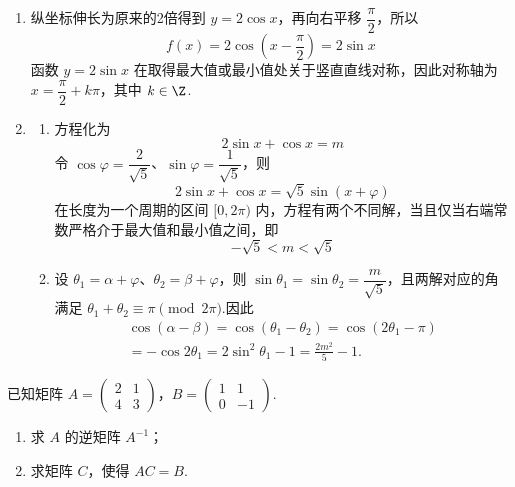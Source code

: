 \begin{solution}
\begin{enumerate}
\item 纵坐标伸长为原来的2倍得到 \(y=2\cos x\)，再向右平移 \(\dfrac\pi2\)，所以
\[
f(x)=2\cos\left(x-\frac\pi2\right)=2\sin x
\]
函数 \(y=2\sin x\) 在取得最大值或最小值处关于竖直直线对称，因此对称轴为
\(x=\dfrac\pi2+k\pi\)，其中 \(k\in\Z\).

\item
\begin{enumerate}
\item 方程化为
\[
2\sin x+\cos x=m
\]
令 \(\cos\varphi=\dfrac2{\sqrt5}\)、\(\sin\varphi=\dfrac1{\sqrt5}\)，则
\[
2\sin x+\cos x=\sqrt5\sin(x+\varphi)
\]
在长度为一个周期的区间 \([0,2\pi)\) 内，方程有两个不同解，当且仅当右端常数严格介于最大值和最小值之间，即
\[
-\sqrt5<m<\sqrt5
\]

\item 设 \(\theta_1=\alpha+\varphi\)、\(\theta_2=\beta+\varphi\)，则
\(\sin\theta_1=\sin\theta_2=\dfrac{m}{\sqrt5}\)，且两解对应的角满足 \(\theta_1+\theta_2\equiv\pi\pmod{2\pi}\).因此
\[
\begin{gathered}
\cos(\alpha-\beta)
 =\cos(\theta_1-\theta_2)=\cos(2\theta_1-\pi)\\
 =-\cos2\theta_1=2\sin^2\theta_1-1=\frac{2m^2}{5}-1.
\end{gathered}
\]
\end{enumerate}
\end{enumerate}
\end{solution}

\begin{problem}
已知矩阵 \(A=\begin{pmatrix}2&1\\4&3\end{pmatrix}\)，\(B=\begin{pmatrix}1&1\\0&-1\end{pmatrix}\).
\begin{enumerate}
\item 求 \(A\) 的逆矩阵 \( A^{-1} \)；
\item 求矩阵 \(C\)，使得 \(AC = B\).
\end{enumerate}
\end{problem}

